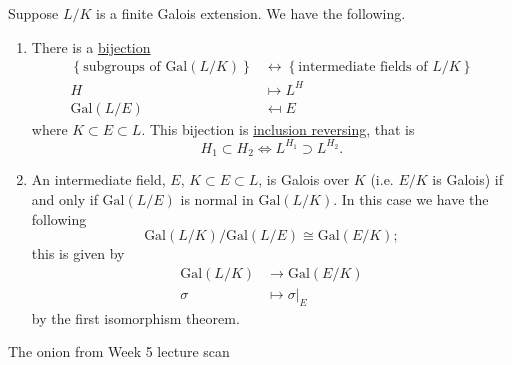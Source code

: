 \documentclass[12pt, a4paper]{article}
\newcommand{\gal}{\text{Gal}}
\begin{document}
\begin{mdthm}
    Suppose \(L/K\) is a finite Galois extension. We have the following.
    \begin{enumerate}
        \item There is a \ul{bijection}
        \[\begin{aligned}
            \left\{ \text{subgroups of \(\gal(L/K)\)} \right\} &\leftrightarrow \left\{ \text{intermediate fields of \(L/K\)} \right\}\\
            H &\mapsto L^H \\
            \gal(L/E) &\mapsfrom E 
        \end{aligned}\]
        where \(K \subset E \subset L\). This bijection is \ul{inclusion reversing}, that is
        \[H_1 \subset H_2 \iff L^{H_1} \supset L^{H_2}.\]
        \item An intermediate field, \(E\), \(K \subset E \subset L\), is Galois over \(K\) (i.e. \(E/K\) is Galois) if and only if \(\gal(L/E)\) is normal in \(\gal(L/K)\). In this case we have the following 
        \[\gal(L/K)/\gal(L/E) \cong \gal(E/K);\]
        this is given by
        \[\begin{aligned}
            \gal(L/K) &\to \gal(E/K) \\
            \sigma &\mapsto \sigma\vert_E
        \end{aligned}\]
        by the first isomorphism theorem.
    \end{enumerate}
\end{mdthm}

\begin{mdexample}
    The onion from Week 5 lecture scan 
\end{mdexample}
\end{document}
